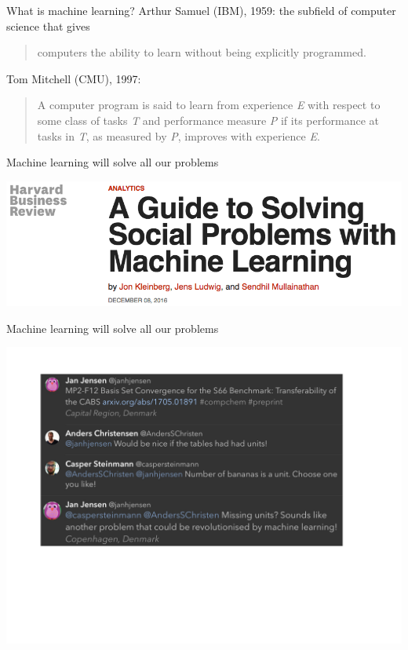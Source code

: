 \documentclass[xetex,compress]{beamer}
\begin{document}
\begin{frame}{What is machine learning?}
  Arthur Samuel (IBM), 1959: the subfield of computer science that gives
  \begin{quote}
    computers the ability to learn without being explicitly programmed.
  \end{quote}
  Tom Mitchell (CMU), 1997:
  \begin{quote}
    A computer program is said to learn from experience \textit{E} with respect to some class of tasks \textit{T} and performance measure \textit{P} if its performance at tasks in \textit{T}, as measured by \textit{P}, improves with experience \textit{E}.
  \end{quote}
\end{frame}

\begin{frame}{Machine learning will solve all our problems}
  \begin{center}
    \includegraphics[width=1.00\textwidth]{./figures/headline.png}
  \end{center}
\end{frame}

\begin{frame}{Machine learning will solve all our problems}
  \begin{center}
    \includegraphics[width=1.10\textwidth]{./figures/twitter.jpeg}
  \end{center}
\end{frame}
\end{document}

